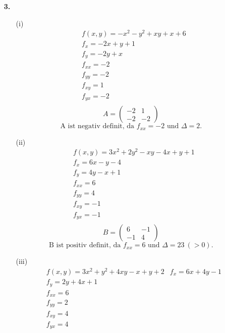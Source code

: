 \documentclass[a4paper,11pt]{article}
\begin{document}
\begin{enumerate}
        \item[\textbf{3.}]
        \begin{enumerate}
                \item[(i)]
        \begin{align*}
        &f(x,y) = -x^2-y^2 +xy +x +6 \\
        &f_x = -2x +y +1 \\
        &f_y = -2y + x \\
        &f_{xx} = -2 \\
        &f_{yy} = -2 \\
        &f_{xy} = 1 \\
        &f_{yx} = -2 \\         
        \end{align*}
        $$ A = \begin{pmatrix}
        -2 & 1\\
        -2 & -2
        \end{pmatrix} $$
        $$ \text{A ist negativ definit, da } f_{xx} = -2 \text{ und } \Delta = 2. $$
        \item[(ii)]
        \begin{align*}
        &f(x,y) = 3x^2 +2y^2 -xy - 4x +y +1 \\
        &f_x = 6x -y -4 \\
        &f_y = 4y -x +1 \\
        &f_{xx} = 6 \\
        &f_{yy} = 4 \\
        &f_{xy} = -1 \\
        &f_{yx} = -1 \\  
        \end{align*}
        $$ B =\begin{pmatrix}
        6 & -1 \\
        -1 & 4	
        \end{pmatrix} $$
        $$ \text{B ist positiv definit, da } f_{xx} = 6 \text{ und } \Delta = 23 \ (> 0).$$ 
        \item[(iii)]
        \begin{align*}
        &f(x,y) = 3x^2+y^2+4xy -x +y +2
        &f_x = 6x+4y-1 \\
        &f_y = 2y +4x +1 \\
        &f_{xx} = 6 \\
        &f_{yy} = 2 \\
        &f_{xy} = 4 \\
        &f_{yx} = 4 \\    

\end{align*}
\end{enumerate}
\end{enumerate}
\end{document}

